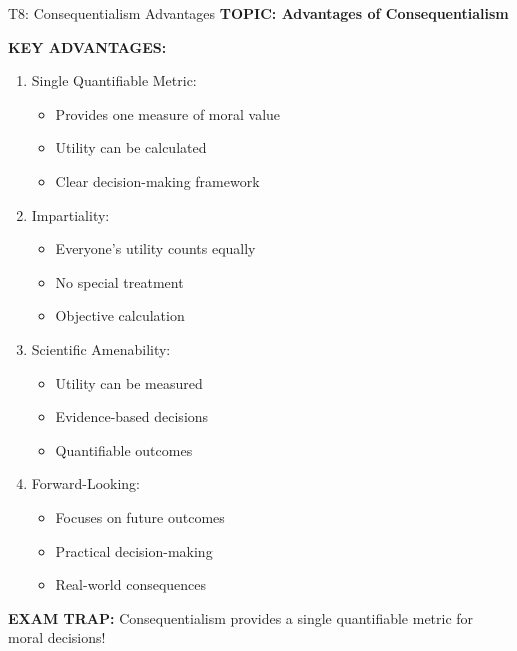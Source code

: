 \documentclass[8pt]{beamer}
\begin{document}
	\begin{frame}{T8: Consequentialism Advantages}
		\fontsize{6.5}{7.5}\selectfont
		\textbf{TOPIC: Advantages of Consequentialism}
		
		\vspace{0.1cm}
		\textbf{KEY ADVANTAGES:}
		\begin{enumerate}
			\item \textcolor{myblue}{Single Quantifiable Metric:}
			\begin{itemize}
				\item Provides one measure of moral value
				\item Utility can be calculated
				\item Clear decision-making framework
			\end{itemize}
			\item \textcolor{myblue}{Impartiality:}
			\begin{itemize}
				\item Everyone's utility counts equally
				\item No special treatment
				\item Objective calculation
			\end{itemize}
			\item \textcolor{myblue}{Scientific Amenability:}
			\begin{itemize}
				\item Utility can be measured
				\item Evidence-based decisions
				\item Quantifiable outcomes
			\end{itemize}
			\item \textcolor{myblue}{Forward-Looking:}
			\begin{itemize}
				\item Focuses on future outcomes
				\item Practical decision-making
				\item Real-world consequences
			\end{itemize}
		\end{enumerate}
		
		\textcolor{myred}{\textbf{EXAM TRAP:}} Consequentialism provides \textcolor{myblue}{a single quantifiable metric} for moral decisions!
	\end{frame}
	
\end{document}
